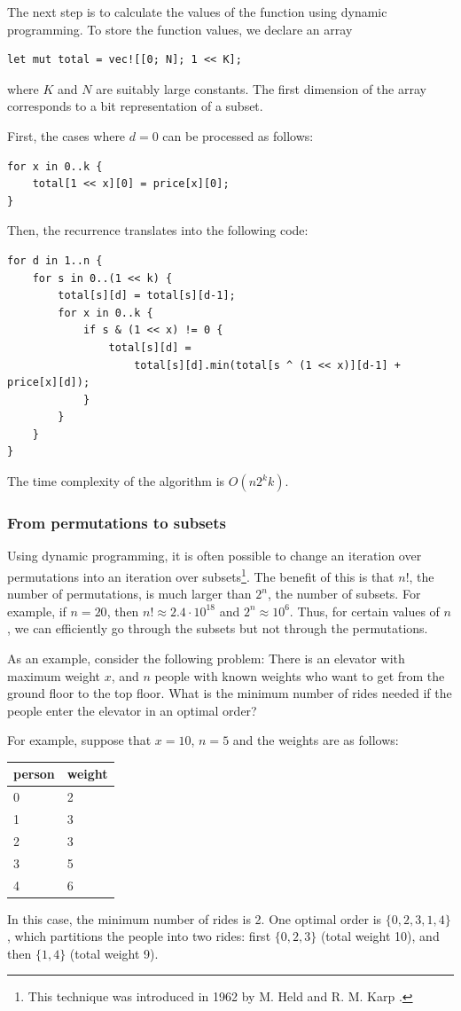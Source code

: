 The next step is to calculate the values of the function
using dynamic programming.
To store the function values, we declare an array
\begin{lstlisting}
let mut total = vec![[0; N]; 1 << K];
\end{lstlisting}
where $K$ and $N$ are suitably large constants.
The first dimension of the array corresponds to a bit
representation of a subset.

First, the cases where $d=0$ can be processed as follows:
\begin{lstlisting}
for x in 0..k {
    total[1 << x][0] = price[x][0];
}
\end{lstlisting}
Then, the recurrence translates into the following code:
\begin{lstlisting}
for d in 1..n {
    for s in 0..(1 << k) {
        total[s][d] = total[s][d-1];
        for x in 0..k {
            if s & (1 << x) != 0 {
                total[s][d] =
                    total[s][d].min(total[s ^ (1 << x)][d-1] + price[x][d]);
            }
        }
    }
}
\end{lstlisting}
The time complexity of the algorithm is $O(n 2^k k)$.

\subsubsection{From permutations to subsets}

Using dynamic programming, it is often possible
to change an iteration over permutations into
an iteration over subsets\footnote{This technique was introduced in 1962
by M. Held and R. M. Karp \cite{hel62}.}.
The benefit of this is that
$n!$, the number of permutations,
is much larger than $2^n$, the number of subsets.
For example, if $n=20$, then
$n! \approx 2.4 \cdot 10^{18}$ and $2^n \approx 10^6$.
Thus, for certain values of $n$,
we can efficiently go through the subsets but not through the permutations.

As an example, consider the following problem:
There is an elevator with maximum weight $x$,
and $n$ people with known weights
who want to get from the ground floor
to the top floor.
What is the minimum number of rides needed
if the people enter the elevator in an optimal order?

For example, suppose that $x=10$, $n=5$
and the weights are as follows:
\begin{center}
\begin{tabular}{ll}
person & weight \\
\hline
0 & 2 \\
1 & 3 \\
2 & 3 \\
3 & 5 \\
4 & 6 \\
\end{tabular}
\end{center}
In this case, the minimum number of rides is 2.
One optimal order is $\{0,2,3,1,4\}$,
which partitions the people into two rides:
first $\{0,2,3\}$ (total weight 10),
and then $\{1,4\}$ (total weight 9).

